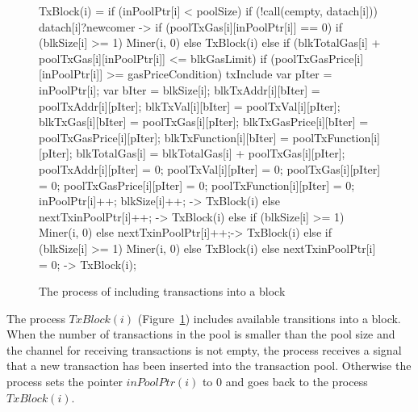 \documentclass{KERauth}
\begin{document}
\begin{figure}[h]
\begin{center}
\begin{boxedverbatim}
TxBlock(i) =
  if (inPoolPtr[i] < poolSize) {
    if (!call(cempty, datach[i])) {
      datach[i]?newcomer ->
      if (poolTxGas[i][inPoolPtr[i]] == 0) {
        if (blkSize[i] >= 1) {
          Miner(i, 0)}
        else { TxBlock(i) }	}
      else {
        if (blkTotalGas[i] + poolTxGas[i][inPoolPtr[i]] <= blkGasLimit) {
          if (poolTxGasPrice[i][inPoolPtr[i]] >= gasPriceCondition) {
            txInclude{
              var pIter = inPoolPtr[i];
              var bIter = blkSize[i];
              blkTxAddr[i][bIter] = poolTxAddr[i][pIter];
              blkTxVal[i][bIter] = poolTxVal[i][pIter];
              blkTxGas[i][bIter] = poolTxGas[i][pIter];
              blkTxGasPrice[i][bIter] = poolTxGasPrice[i][pIter];
              blkTxFunction[i][bIter] = poolTxFunction[i][pIter];
              blkTotalGas[i] = blkTotalGas[i] + poolTxGas[i][pIter];
              poolTxAddr[i][pIter] = 0;
              poolTxVal[i][pIter] = 0;
              poolTxGas[i][pIter] = 0;
              poolTxGasPrice[i][pIter] = 0;
              poolTxFunction[i][pIter] = 0;
              inPoolPtr[i]++;
              blkSize[i]++;} ->
            TxBlock(i)}
          else {nextTx{inPoolPtr[i]++;} ->
        TxBlock(i)}} 
      else if (blkSize[i] >= 1) {Miner(i, 0)} 
      else {nextTx{inPoolPtr[i]++;}->
      TxBlock(i)}}} 
    else if (blkSize[i] >= 1) {Miner(i, 0)}
    else { TxBlock(i) }} 
  else {nextTx{inPoolPtr[i] = 0;} -> TxBlock(i)};
\end{boxedverbatim}
\end{center}
\caption{The process of including transactions into a block}\label{fig:txblock}
\end{figure}

The process $TxBlock(i)$ (Figure~\ref{fig:txblock}) includes available transitions into a block. When the number of transactions in the pool is smaller than the pool size and the channel for receiving transactions is not empty, the process receives a signal that a new transaction has been inserted into the transaction pool. Otherwise the process sets the pointer $inPoolPtr(i)$ to $0$ and goes back to the process $TxBlock(i)$.
\end{document}
